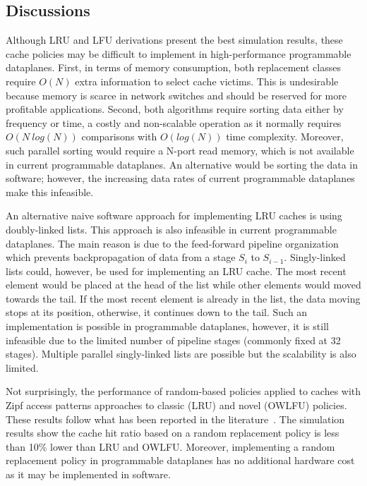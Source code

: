\subsection{Discussions}

Although LRU and LFU derivations present the best simulation results, these cache policies may be difficult to implement in high-performance programmable dataplanes.
First, in terms of memory consumption, both replacement classes require $O(N)$ extra information to select cache victims.
This is undesirable because memory is scarce in network switches and should be reserved for more profitable applications.
Second, both algorithms require sorting data either by frequency or time, a costly and non-scalable operation as it normally requires $O(N~log(N))$ comparisons with $O(log(N))$ time complexity.
Moreover, such parallel sorting would require a N-port read memory, which is not available in current programmable dataplanes.
An alternative would be sorting the data in software; however, the increasing data rates of current programmable dataplanes make this infeasible.  

An alternative naive software approach for implementing LRU caches is using doubly-linked lists.
This approach is also infeasible in current programmable dataplanes.
The main reason is due to the feed-forward pipeline organization which prevents backpropagation of data from a stage $S_{i}$ to $S_{i-1}$.
Singly-linked lists could, however, be used for implementing an LRU cache.
The most recent element would be placed at the head of the list while other elements would moved towards the tail.
If the most recent element is already in the list, the data moving stops at its position, otherwise, it continues down to the tail.
Such an implementation is possible in programmable dataplanes, however, it is still infeasible due to the limited number of pipeline stages (commonly fixed at 32 stages).
Multiple parallel singly-linked lists are possible but the scalability is also limited.

Not surprisingly, the performance of random-based policies applied to caches with Zipf access patterns approaches to classic (LRU) and novel (OWLFU) policies.
These results follow what has been reported in the literature~\cite{Gallo:2014}.
The simulation results show the cache hit ratio based on a random replacement policy is less than 10\% lower than LRU and OWLFU.
Moreover, implementing a random replacement policy in programmable dataplanes has no additional hardware cost as it may be implemented in software.

